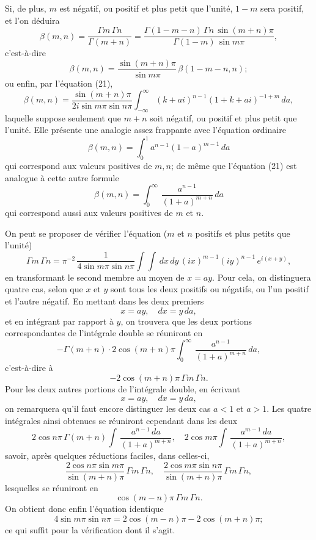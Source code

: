 \documentclass[12pt,a4paper]{article}
\begin{document}
Si, de plus, $m$ est n\'egatif, ou positif et plus petit que l'unit\'e, $1 - m$ sera positif, et l'on d\'eduira
\[
\beta(m, n) = \frac{\Gamma m\,\Gamma n}{\Gamma(m + n)} = \frac{\Gamma(1 - m - n)\,\Gamma n\,\sin(m + n)\pi}{\Gamma(1 - m)\,\sin m\pi},
\]
c'est-\`a-dire
\[
\beta(m, n) = \frac{\sin(m + n)\pi}{\sin m\pi}\,\beta(1 - m - n, n);
\]
ou enfin, par l'\'equation (21),
\[
\beta(m, n) = \frac{\sin(m + n)\pi}{2i\sin m\pi\sin n\pi}\int_{-\infty}^{\infty}(k + ai)^{n-1}(1 + k + ai)^{-1+m}\,da,
\]
laquelle suppose seulement que $m + n$ soit n\'egatif, ou positif et plus petit que l'unit\'e. Elle pr\'esente une analogie assez frappante avec l'\'equation ordinaire
\[
\beta(m, n) = \int_0^1 a^{n-1}(1 - a)^{m-1}\,da
\]
qui correspond aux valeurs positives de $m, n$; de m\^eme que l'\'equation (21) est analogue \`a cette autre formule
\[
\beta(m, n) = \int_0^\infty\,\frac{a^{n-1}}{(1 + a)^{m+n}}\,da
\]
qui correspond aussi aux valeurs positives de $m$ et $n$.

On peut se proposer de v\'erifier l'\'equation ($m$ et $n$ positifs et plus petits que l'unit\'e)
\[
\Gamma m\,\Gamma n = \pi^{-2}\,\frac{1}{4\sin m\pi\sin n\pi}\int\!\!\int\,dx\,dy\,(ix)^{m-1}(iy)^{n-1}\,e^{i(x + y)},
\]
en transformant le second membre au moyen de $x = ay$. Pour cela, on distinguera quatre cas, selon que $x$ et $y$ sont tous les deux positifs ou n\'egatifs, ou l'un positif et l'autre n\'egatif. En mettant dans les deux premiers
\[
x = ay,\quad dx = y\,da,
\]
et en int\'egrant par rapport \`a $y$, on trouvera que les deux portions correspondantes de l'int\'egrale double se r\'euniront en
\[
-\Gamma(m + n)\cdot 2\cos(m + n)\pi\int_0^\infty\,\frac{a^{n-1}}{(1 + a)^{m+n}}\,da,
\]
c'est-\`a-dire \`a
\[
-2\cos(m + n)\pi\,\Gamma m\,\Gamma n.
\]
Pour les deux autres portions de l'int\'egrale double, en \'ecrivant
\[
x = ay,\quad dx = y\,da,
\]
on remarquera qu'il faut encore distinguer les deux cas $a < 1$ et $a > 1$. Les quatre int\'egrales ainsi obtenues se r\'euniront cependant dans les deux
\[
2\cos n\pi\,\Gamma(m + n)\int\,\frac{a^{n-1}\,da}{(1 + a)^{m+n}},\quad 2\cos m\pi\int\,\frac{a^{m-1}\,da}{(1 + a)^{m+n}},
\]
savoir, apr\`es quelques r\'eductions faciles, dans celles-ci,
\[
\frac{2\cos n\pi\sin m\pi}{\sin(m + n)\pi}\,\Gamma m\,\Gamma n,\quad \frac{2\cos m\pi\sin n\pi}{\sin(m + n)\pi}\,\Gamma m\,\Gamma n,
\]
lesquelles se r\'euniront en
\[
\cos(m - n)\pi\,\Gamma m\,\Gamma n.
\]
On obtient donc enfin l'\'equation identique
\[
4\sin m\pi\sin n\pi = 2\cos(m - n)\pi - 2\cos(m + n)\pi;
\]
ce qui suffit pour la v\'erification dont il s'agit.
\end{document}
